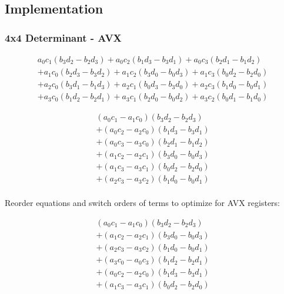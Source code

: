 \documentclass[]{scrartcl}
\newcommand{\pth}[1]{\left(#1\right)}
\begin{document}
\subsection{Implementation}

\subsubsection{4x4 Determinant - AVX}
\label{sec:determinant4x4}

\begin{align*}
  a_0c_1 \pth{b_3d_2 - b_2d_3}
+ a_0c_2 \pth{b_1d_3 - b_3d_1}            
+ a_0c_3 \pth{b_2d_1 - b_1d_2}\\
+ a_1c_0 \pth{b_2d_3 - b_3d_2}
+ a_1c_2 \pth{b_3d_0 - b_0d_3}
+ a_1c_3 \pth{b_0d_2 - b_2d_0}\\
+ a_2c_0 \pth{b_3d_1 - b_1d_3}
+ a_2c_1 \pth{b_0d_3 - b_3d_0}
+ a_2c_3 \pth{b_1d_0 - b_0d_1}\\
+ a_3c_0 \pth{b_1d_2 - b_2d_1}
+ a_3c_1 \pth{b_2d_0 - b_0d_2}
+ a_3c_2 \pth{b_0d_1 - b_1d_0}
\end{align*}

\begin{align*}
  \pth{a_0c_1 - a_1c_0} \pth{b_3d_2 - b_2d_3} \\
+ \pth{a_0c_2 - a_2c_0} \pth{b_1d_3 - b_3d_1} \\
+ \pth{a_0c_3 - a_3c_0} \pth{b_2d_1 - b_1d_2} \\
+ \pth{a_1c_2 - a_2c_1} \pth{b_3d_0 - b_0d_3} \\
+ \pth{a_1c_3 - a_3c_1} \pth{b_0d_2 - b_2d_0} \\ 
+ \pth{a_2c_3 - a_3c_2} \pth{b_1d_0 - b_0d_1} \\ 
\end{align*}

Reorder equations and switch orders of terms to optimize for AVX registers:

\begin{align}
  \pth{a_0c_1 - a_1c_0} \pth{b_3d_2 - b_2d_3} \nonumber\\
+ \pth{a_1c_2 - a_2c_1} \pth{b_3d_0 - b_0d_3} \nonumber\\ 
+ \pth{a_2c_3 - a_3c_2} \pth{b_1d_0 - b_0d_1} \nonumber\\
+ \pth{a_3c_0 - a_0c_3} \pth{b_1d_2 - b_2d_1} \nonumber\\
+ \pth{a_0c_2 - a_2c_0} \pth{b_1d_3 - b_3d_1} \nonumber\\
+ \pth{a_1c_3 - a_3c_1} \pth{b_0d_2 - b_2d_0} 
\end{align}
\end{document}
